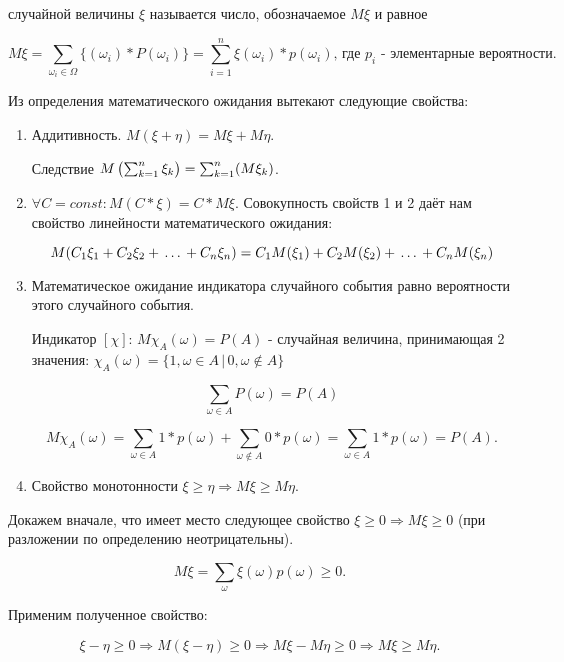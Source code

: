 \documentclass[a4paper,twoside,12pt]{report}
\begin{document}
	 случайной величины $\xi$ называется число, обозначаемое $M\xi$ и равное 

	$$
	  M\xi = \sum_{\omega_i \in \Omega}\{(\omega_i)*P(\omega_i)\} 
	       = \sum^n_{i=1}\xi(\omega_i)*p(\omega_i)
	       \mbox{, где $p_i$ - элементарные вероятности.}
	$$

	Из определения математического ожидания вытекают следующие свойства:


	\begin{enumerate}

	\item	Аддитивность. $M(\xi + \eta) = M\xi + M\eta$. 

		Следствие $M\left(\sum^n_{k=1}\strut\xi_k\right)=\sum^n_{k=1}(M\xi_k)$.


	\item	$\forall C = const: M(C*\xi) = C*M\xi$. Совокупность свойств 1 и 2 даёт нам свойство линейности математического ожидания:

	$$
	  M(C_1\xi_1 + C_2\xi_2 + \,\ldots\, + C_n\xi_n) 
	    = C_1M(\xi_1) + C_2M(\xi_2) + \,\ldots\, + C_nM(\xi_n)
	$$


	\item	Математическое ожидание индикатора случайного события равно вероятности этого случайного события. 

	Индикатор $[\chi]$: $M\chi_A (\omega) = P(A)$ - случайная величина, принимающая 2 значения: 
		$
		  \chi_A(\omega) = \{1, \omega \in A \,|\, 0, \omega \not\in A\}
		$

		$$
		  \sum_{\omega \in A}P(\omega) = P(A)
		$$

		$$
		  M\chi_A(\omega) = \sum_{\omega \in A}1*p(\omega) + \sum_{\omega \not\in A}0*p(\omega)
		                  = \sum_{\omega \in A}1*p(\omega) = P(A).
		$$

	
	\item	Свойство монотонности $\xi \geqslant \eta \Rightarrow M\xi \geqslant M\eta$.

	\end{enumerate}


	Докажем вначале, что имеет место следующее свойство $\xi \geqslant 0 \Rightarrow M\xi \geqslant 0$ (при разложении по определению неотрицательны).

	$$
	  M\xi = \sum_\omega\xi(\omega)p(\omega) \geqslant 0.
	$$
	
	Применим полученное свойство:

	$$
	  \xi - \eta \geqslant 0 \Rightarrow 
	   M(\xi - \eta) \geqslant 0 \Rightarrow 
	   M\xi - M\eta \geqslant 0 \Rightarrow 
	   M\xi \geqslant M\eta.
	$$
\end{document}

